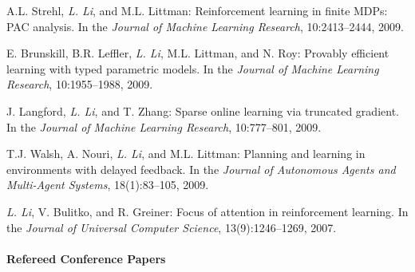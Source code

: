 \documentclass[10pt,twoside,letterpaper]{article}
\newcommand{\selffont}[1]{{\textit{#1}}}
\newcommand{\venuefont}[1]{{\textit{#1}}}
\newcommand{\negitemspace}{\vspace{1mm}}
\newcommand{\myself}{\selffont{L. Li}}
\begin{document}
\begin{compactenum}[(J1)]
\item{A.L. Strehl, \myself, and M.L. Littman:
Reinforcement learning in finite MDPs: PAC analysis.  In the
\venuefont{Journal of Machine Learning Research}, 10:2413--2444, 2009.}

\item{E. Brunskill, B.R. Leffler, \myself, M.L. Littman,
and N. Roy: Provably efficient learning with typed parametric
models.  In the \venuefont{Journal of Machine Learning Research},
10:1955--1988, 2009.}

\item{J. Langford, \myself, and T. Zhang: Sparse online
learning via truncated gradient. In the \venuefont{Journal of Machine
Learning Research}, 10:777--801, 2009.}

\item{T.J. Walsh, A. Nouri, \myself, and M.L. Littman:
Planning and learning in environments with delayed feedback. In
the \venuefont{Journal of Autonomous Agents and Multi-Agent
Systems}, 18(1):83--105, 2009.}

\item{\myself, V. Bulitko, and R. Greiner: Focus of
attention in reinforcement learning. In the \venuefont{Journal of
Universal Computer Science}, 13(9):1246--1269, 2007.}


\end{compactenum}

\paragraph{Refereed Conference Papers} \negitemspace
\end{document}
